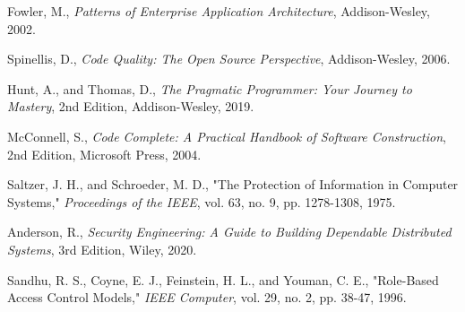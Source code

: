 \vspace{0.2cm}

\noindent [8] Fowler, M., \textit{Patterns of Enterprise Application Architecture}, Addison-Wesley, 2002.


\vspace{0.3cm}

\noindent [9] Spinellis, D., \textit{Code Quality: The Open Source Perspective}, Addison-Wesley, 2006.

\vspace{0.2cm}

\noindent [10] Hunt, A., and Thomas, D., \textit{The Pragmatic Programmer: Your Journey to Mastery}, 2nd Edition, Addison-Wesley, 2019.

\vspace{0.2cm}

\noindent [11] McConnell, S., \textit{Code Complete: A Practical Handbook of Software Construction}, 2nd Edition, Microsoft Press, 2004.


\vspace{0.3cm}

\noindent [12] Saltzer, J. H., and Schroeder, M. D., "The Protection of Information in Computer Systems," \textit{Proceedings of the IEEE}, vol. 63, no. 9, pp. 1278-1308, 1975.

\vspace{0.2cm}

\noindent [13] Anderson, R., \textit{Security Engineering: A Guide to Building Dependable Distributed Systems}, 3rd Edition, Wiley, 2020.

\vspace{0.2cm}

\noindent [14] Sandhu, R. S., Coyne, E. J., Feinstein, H. L., and Youman, C. E., "Role-Based Access Control Models," \textit{IEEE Computer}, vol. 29, no. 2, pp. 38-47, 1996.


